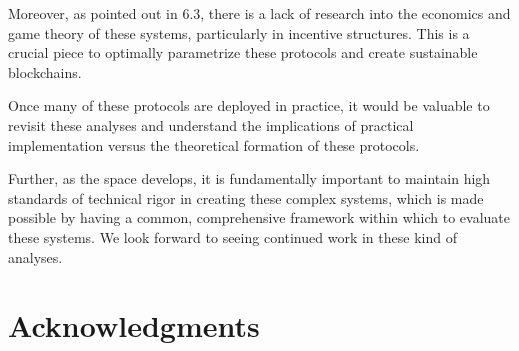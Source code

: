 \documentclass[10pt,journal,compsoc]{IEEEtran}
\begin{document}
Moreover, as pointed out in 6.3, there is a lack of research into the economics and game theory of these systems, particularly in incentive structures. This is a crucial piece to optimally parametrize these protocols and create sustainable blockchains.

Once many of these protocols are deployed in practice, it would be valuable to revisit these analyses and understand the implications of practical implementation versus the theoretical formation of these protocols.

Further, as the space develops, it is fundamentally important to maintain high standards of technical rigor in creating these complex systems, which is made possible by having a common, comprehensive framework within which to evaluate these systems. We look forward to seeing continued work in these kind of analyses.



%



\ifCLASSOPTIONcompsoc
  \section*{Acknowledgments}
\else
\end{document}
